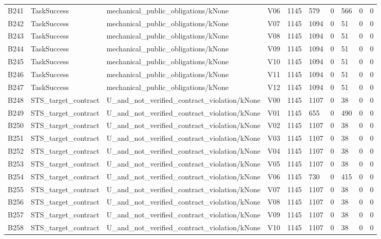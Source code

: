 \begin{longtable}{llllllllll}
B241 & TaskSuccess & mechanical\_public\_obligations/kNone & V06 & 1145 & 579 & 0 & 566 & 0 & 0 \\
B242 & TaskSuccess & mechanical\_public\_obligations/kNone & V07 & 1145 & 1094 & 0 & 51 & 0 & 0 \\
B243 & TaskSuccess & mechanical\_public\_obligations/kNone & V08 & 1145 & 1094 & 0 & 51 & 0 & 0 \\
B244 & TaskSuccess & mechanical\_public\_obligations/kNone & V09 & 1145 & 1094 & 0 & 51 & 0 & 0 \\
B245 & TaskSuccess & mechanical\_public\_obligations/kNone & V10 & 1145 & 1094 & 0 & 51 & 0 & 0 \\
B246 & TaskSuccess & mechanical\_public\_obligations/kNone & V11 & 1145 & 1094 & 0 & 51 & 0 & 0 \\
B247 & TaskSuccess & mechanical\_public\_obligations/kNone & V12 & 1145 & 1094 & 0 & 51 & 0 & 0 \\
B248 & STS\_target\_contract & U\_and\_not\_verified\_contract\_violation/kNone & V00 & 1145 & 1107 & 0 & 38 & 0 & 0 \\
B249 & STS\_target\_contract & U\_and\_not\_verified\_contract\_violation/kNone & V01 & 1145 & 655 & 0 & 490 & 0 & 0 \\
B250 & STS\_target\_contract & U\_and\_not\_verified\_contract\_violation/kNone & V02 & 1145 & 1107 & 0 & 38 & 0 & 0 \\
B251 & STS\_target\_contract & U\_and\_not\_verified\_contract\_violation/kNone & V03 & 1145 & 1107 & 0 & 38 & 0 & 0 \\
B252 & STS\_target\_contract & U\_and\_not\_verified\_contract\_violation/kNone & V04 & 1145 & 1107 & 0 & 38 & 0 & 0 \\
B253 & STS\_target\_contract & U\_and\_not\_verified\_contract\_violation/kNone & V05 & 1145 & 1107 & 0 & 38 & 0 & 0 \\
B254 & STS\_target\_contract & U\_and\_not\_verified\_contract\_violation/kNone & V06 & 1145 & 730 & 0 & 415 & 0 & 0 \\
B255 & STS\_target\_contract & U\_and\_not\_verified\_contract\_violation/kNone & V07 & 1145 & 1107 & 0 & 38 & 0 & 0 \\
B256 & STS\_target\_contract & U\_and\_not\_verified\_contract\_violation/kNone & V08 & 1145 & 1107 & 0 & 38 & 0 & 0 \\
B257 & STS\_target\_contract & U\_and\_not\_verified\_contract\_violation/kNone & V09 & 1145 & 1107 & 0 & 38 & 0 & 0 \\
B258 & STS\_target\_contract & U\_and\_not\_verified\_contract\_violation/kNone & V10 & 1145 & 1107 & 0 & 38 & 0 & 0 \\

\end{longtable}
